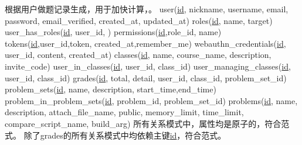 \markdownRendererUlItem 根据用户做题记录生成，用于加快计算，。\markdownRendererUlItemEnd 
\markdownRendererUlEndTight \markdownRendererInterblockSeparator
{}\markdownRendererInterblockSeparator
{}\markdownRendererInterblockSeparator
{}\markdownRendererInterblockSeparator
{}\markdownRendererInterblockSeparator
{}\markdownRendererUlBeginTight
\markdownRendererUlItem user(\underline{id}, nickname, username, email, password, email\_verified, created\_at, updated\_at)\markdownRendererUlItemEnd 
\markdownRendererUlItem roles(\underline{id}, name, target)\markdownRendererUlItemEnd 
\markdownRendererUlItem user\_has\_roles(\underline{id}, user\_id, )\markdownRendererUlItemEnd 
\markdownRendererUlItem permissions(\underline{id},role\_id, name)\markdownRendererUlItemEnd 
\markdownRendererUlItem tokens(\underline{id},user\_id,token, created\_at,remember\_me)\markdownRendererUlItemEnd 
\markdownRendererUlItem webauthn\_credentials(\underline{id}, user\_id, content, created\_at)\markdownRendererUlItemEnd 
\markdownRendererUlItem classes(\underline{id}, name, course\_name, description, invite\_code)\markdownRendererUlItemEnd 
\markdownRendererUlItem user\_in\_classes(\underline{id}, user\_id, class\_id)\markdownRendererUlItemEnd 
\markdownRendererUlItem user\_managing\_classes(\underline{id}, user\_id, class\_id)\markdownRendererUlItemEnd 
\markdownRendererUlItem grades(\underline{id}, total, detail, user\_id, class\_id, problem\_set\_id)\markdownRendererUlItemEnd 
\markdownRendererUlItem problem\_sets(\underline{id}, name, description, start\_time,end\_time)\markdownRendererUlItemEnd 
\markdownRendererUlItem problem\_in\_problem\_sets(\underline{id}, problem\_id, problem\_set\_id)\markdownRendererUlItemEnd 
\markdownRendererUlItem problems(\underline{id}, name, description, attach\_file\_name, public, memory\_limit, time\_limit, compare\_script\_name, build\_arg)\markdownRendererUlItemEnd 
\markdownRendererUlEndTight \markdownRendererInterblockSeparator
{}\markdownRendererInterblockSeparator
{}\markdownRendererInterblockSeparator
{}所有关系模式中，属性均是原子的，符合范式。\markdownRendererInterblockSeparator
{}\markdownRendererInterblockSeparator
{}除了grades的所有关系模式中均依赖主键\underline{id}，符合范式。\markdownRendererInterblockSeparator

